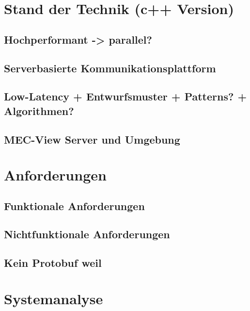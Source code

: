 \documentclass[
	12pt,
	table,
	bigheadings,
	ngerman,
	a4paper,
	BCOR5mm,
	DIV14,
	1.1headlines,
	pagesize,
	oneside,
	openright,
	titlepage,
	headsepline,
	nochapterprefix,
	bibtotoc,
	tocindent,
	listsindent,
	pointlessnumbers,
	cleardoubleempty,
	fleqn,
	halfparskip
]{scrbook}
\begin{document}
	
	\setcounter{page}{0}
	
	
	
	
	
	
	
	\thispagestyle{empty}
	
	
	\clearpage	
	\hypersetup{allcolors=black}
	\tableofcontents
	\hypersetup{allcolors=blue}
	\newpage
	
	
	\setcounter{page}{1}
	
	
	

	
	\chapter{Stand der Technik (c++ Version)}
		\section{Hochperformant -> parallel?}
		\section{Serverbasierte Kommunikationsplattform}
		\section{Low-Latency + Entwurfsmuster + Patterns? + Algorithmen?}
		
		\section{MEC-View Server und Umgebung}
		
	
	\chapter{Anforderungen}
		\section{Funktionale Anforderungen}
		\section{Nichtfunktionale Anforderungen}
		\section{Kein Protobuf weil}
	
	\chapter{Systemanalyse}
\end{document}
